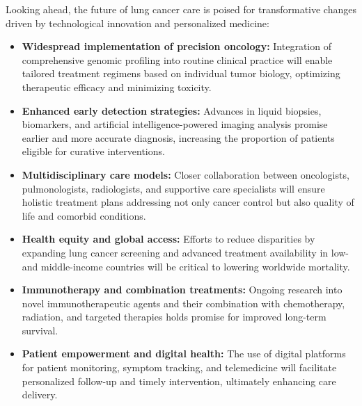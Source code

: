 Looking ahead, the future of lung cancer care is poised for transformative changes driven by 
technological innovation and personalized medicine:

\begin{itemize}
    \item \textbf{Widespread implementation of precision oncology:} Integration of comprehensive 
    genomic profiling into routine clinical practice will enable tailored treatment regimens based 
    on individual tumor biology, optimizing therapeutic efficacy and minimizing toxicity.
    
    \item \textbf{Enhanced early detection strategies:} Advances in liquid biopsies, biomarkers, and 
    artificial intelligence-powered imaging analysis promise earlier and more accurate diagnosis, 
    increasing the proportion of patients eligible for curative interventions.
    
    \item \textbf{Multidisciplinary care models:} Closer collaboration between oncologists, 
    pulmonologists, radiologists, and supportive care specialists will ensure holistic treatment 
    plans addressing not only cancer control but also quality of life and comorbid conditions.
    
    \item \textbf{Health equity and global access:} Efforts to reduce disparities by expanding lung 
    cancer screening and advanced treatment availability in low- and middle-income countries will be 
    critical to lowering worldwide mortality.
    
    \item \textbf{Immunotherapy and combination treatments:} Ongoing research into novel 
    immunotherapeutic agents and their combination with chemotherapy, radiation, and targeted 
    therapies holds promise for improved long-term survival.
    
    \item \textbf{Patient empowerment and digital health:} The use of digital platforms for patient 
    monitoring, symptom tracking, and telemedicine will facilitate personalized follow-up and timely 
    intervention, ultimately enhancing care delivery.
\end{itemize}

